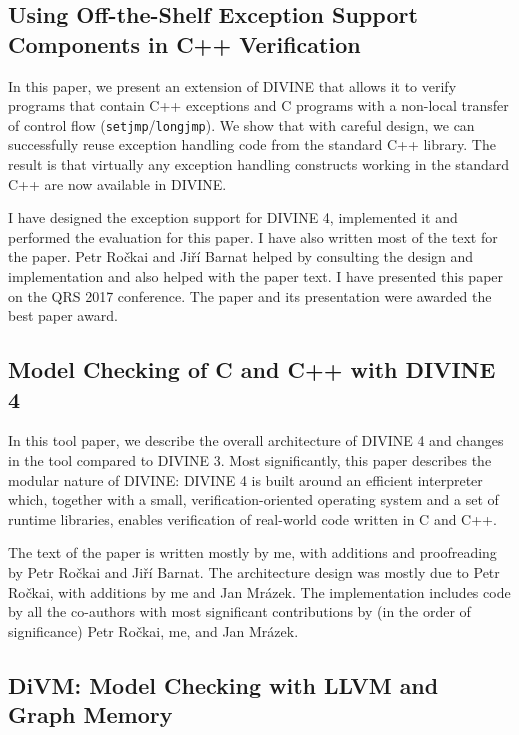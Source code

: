 \bigskip\noindent{}

\subsection*{Using Off-the-Shelf Exception Support Components in C++ Verification}

In this paper, we present an extension of DIVINE that allows it to verify programs that contain C++ exceptions and C programs with a non-local transfer of control flow (\texttt{setjmp}/\texttt{longjmp}).
We show that with careful design, we can successfully reuse exception handling code from the standard C++ library.
The result is that virtually any exception handling constructs working in the standard C++ are now available in DIVINE.

\contrib I have designed the exception support for DIVINE 4, implemented it and performed the evaluation for this paper.
I have also written most of the text for the paper.
Petr Ročkai and Jiří Barnat helped by consulting the design and implementation and also helped with the paper text.
I have presented this paper on the QRS 2017 conference.
The paper and its presentation were awarded the best paper award.

\bigskip\noindent{}

\subsection*{Model Checking of C and C++ with DIVINE 4}

In this tool paper, we describe the overall architecture of DIVINE 4 and changes in the tool compared to DIVINE 3.
Most significantly, this paper describes the modular nature of DIVINE: DIVINE 4 is built around an efficient interpreter which, together with a small, verification-oriented operating system and a set of runtime libraries, enables verification of real-world code written in C and C++.

\contrib The text of the paper is written mostly by me, with additions and proofreading by Petr Ročkai and Jiří Barnat.
The architecture design was mostly due to Petr Ročkai, with additions by me and Jan Mrázek.
The implementation includes code by all the co-authors with most significant contributions by (in the order of significance) Petr Ročkai, me, and Jan Mrázek.

\bigskip\noindent{}

\subsection*{DiVM: Model Checking with LLVM and Graph Memory}

